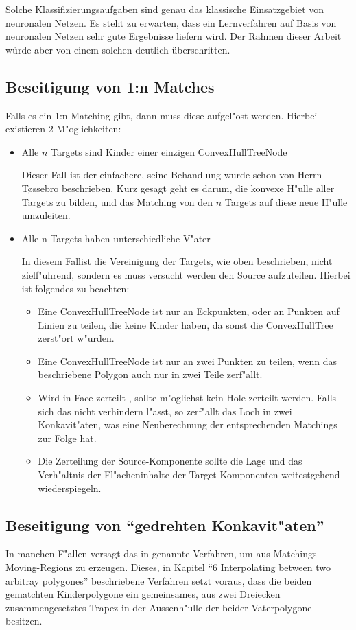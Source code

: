 Solche Klassifizierungsaufgaben sind genau das klassische Einsatzgebiet von neuronalen Netzen. Es steht zu erwarten, dass ein Lernverfahren auf Basis von neuronalen Netzen sehr gute Ergebnisse liefern wird. Der Rahmen dieser Arbeit würde aber von einem solchen deutlich überschritten.

\subsection{Beseitigung von 1:n Matches}

Falls es ein 1:n Matching gibt, dann muss diese aufgel"ost werden. Hierbei existieren 2 M"oglichkeiten:
\begin{itemize}
\item Alle $n$ Targets sind Kinder einer einzigen ConvexHullTreeNode

Dieser Fall ist der einfachere, seine Behandlung wurde schon von Herrn T\o{}ssebro beschrieben. Kurz gesagt geht es darum, die konvexe H"ulle aller Targets zu bilden, und das Matching von den $n$ Targets auf diese neue H"ulle umzuleiten.

\item Alle n Targets haben unterschiedliche V"ater

In diesem Fallist die Vereinigung der Targets, wie oben beschrieben, nicht zielf"uhrend, sondern es muss versucht werden den Source aufzuteilen. Hierbei ist folgendes zu beachten:
\begin{itemize}
\item Eine ConvexHullTreeNode ist nur an Eckpunkten, oder an Punkten auf Linien zu teilen, die keine Kinder haben, da sonst die ConvexHullTree zerst"ort w"urden.

\item Eine ConvexHullTreeNode ist nur an zwei Punkten zu teilen, wenn das beschriebene Polygon auch nur in zwei Teile zerf"allt.
\item Wird in Face zerteilt , sollte m"oglichst kein Hole zerteilt werden. Falls sich das nicht verhindern l"asst, so zerf"allt das Loch in zwei Konkavit"aten, was eine Neuberechnung der entsprechenden Matchings zur Folge hat.

\item Die Zerteilung der Source-Komponente sollte die Lage und das Verh"altnis der Fl"acheninhalte der Target-Komponenten weitestgehend wiederspiegeln.

\end{itemize} 
\end{itemize} 
\subsection{Beseitigung von "`gedrehten Konkavit"aten"'}
In manchen F"allen versagt das in \cite{TG} genannte Verfahren, um aus Matchings Moving-Regions zu erzeugen. Dieses, in Kapitel "`6 Interpolating between two arbitray polygones"' beschriebene Verfahren setzt voraus, dass die beiden gematchten Kinderpolygone ein gemeinsames, aus zwei Dreiecken zusammengesetztes Trapez in der Aussenh"ulle der beider Vaterpolygone besitzen. 

